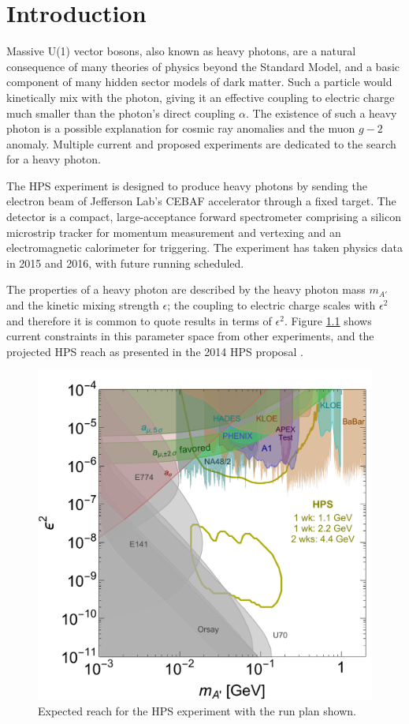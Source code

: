 \chapter{Introduction}
Massive U(1) vector bosons, also known as heavy photons, are a natural consequence of many theories of physics beyond the Standard Model, and a basic component of many hidden sector models of dark matter.
Such a particle would kinetically mix with the photon, giving it an effective coupling to electric charge much smaller than the photon's direct coupling $\alpha$.
The existence of such a heavy photon is a possible explanation for cosmic ray anomalies and the muon $g-2$ anomaly.
Multiple current and proposed experiments are dedicated to the search for a heavy photon.

The HPS experiment is designed to produce heavy photons by sending the electron beam of Jefferson Lab's CEBAF accelerator through a fixed target.
The detector is a compact, large-acceptance forward spectrometer comprising a silicon microstrip tracker for momentum measurement and vertexing and an electromagnetic calorimeter for triggering.
The experiment has taken physics data in 2015 and 2016, with future running scheduled.

The properties of a heavy photon are described by the heavy photon mass $m_{A'}$ and the kinetic mixing strength $\epsilon$; the coupling to electric charge scales with $\epsilon^2$ and therefore it is common to quote results in terms of $\epsilon^2$.
Figure \ref{fig:reach} shows current constraints in this parameter space from other experiments, and the projected HPS reach as presented in the 2014 HPS proposal \cite{collaboration_heavy_2013}.

\begin{figure}[ht]
    \includegraphics[width=\textwidth]{intro/figs/A-visible-HPS-official-6-2015}
    \caption{Expected reach for the HPS experiment with the run plan shown.}
    \label{fig:reach}
\end{figure}

